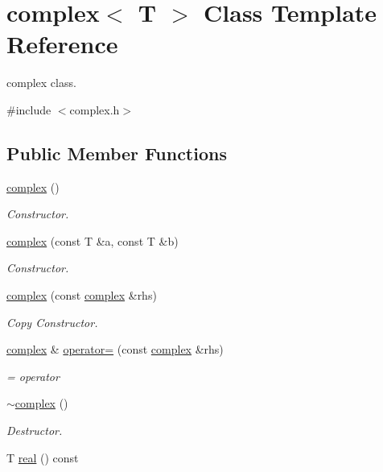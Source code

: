 \hypertarget{classcomplex}{}\section{complex$<$ T $>$ Class Template Reference}
\label{classcomplex}


complex class.  




{\ttfamily \#include $<$complex.\+h$>$}

\subsection*{Public Member Functions}
\begin{DoxyCompactItemize}
\item 
\hyperlink{classcomplex_a9752049742449cbc9571cd8f183f72b2}{complex} ()
\begin{DoxyCompactList}\small\item\em Constructor. \end{DoxyCompactList}\item 
\hyperlink{classcomplex_a27a5d75c2060b32de98ae4666fd691d1}{complex} (const T \&a, const T \&b)
\begin{DoxyCompactList}\small\item\em Constructor. \end{DoxyCompactList}\item 
\hyperlink{classcomplex_aca6c030056b5e089883c5e64a0309c28}{complex} (const \hyperlink{classcomplex}{complex} \&rhs)
\begin{DoxyCompactList}\small\item\em Copy Constructor. \end{DoxyCompactList}\item 
\hyperlink{classcomplex}{complex} \& \hyperlink{classcomplex_a67d65378570f4b7a158b14a1502cc75f}{operator=} (const \hyperlink{classcomplex}{complex} \&rhs)
\begin{DoxyCompactList}\small\item\em = operator \end{DoxyCompactList}\item 
\hyperlink{classcomplex_a949d63a288cccf405266874f95357815}{$\sim$complex} ()
\begin{DoxyCompactList}\small\item\em Destructor. \end{DoxyCompactList}\item 
T \hyperlink{classcomplex_a9e88306cc536506d0370b7376e40287b}{real} () const

\end{DoxyCompactItemize}
